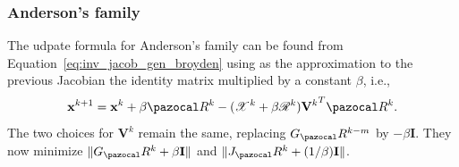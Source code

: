 \subsubsection{Anderson's family}

The udpate formula for Anderson's family can be found from Equation~\eqref{eq:inv_jacob_gen_broyden} using as the approximation to the previous Jacobian the identity matrix multiplied by a constant \(\beta\), i.e.,
\begin{equation} \label{eq:andersons_family_update}
  \mathbf x^{k+1} = \mathbf x^{k} + \beta \pazocal R^k - (\mathscr X^k + \beta\mathscr R^k){\mathbf V^k}^T \pazocal R^k.
\end{equation}
The two choices for \(\mathbf V^k\) remain the same, replacing \(G_\pazocal R^{k-m}\) by \(-\beta\mathbf I\).
They now minimize \(\|G_\pazocal R^k+\beta\mathbf I\|\) and \(\|J_\pazocal R^k + (1/\beta)\mathbf I\|\).

